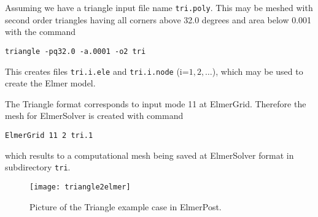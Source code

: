 Assuming we have a triangle input file name \texttt{tri.poly}. This may be meshed 
with second order triangles having all corners above 32.0 degrees and 
area below 0.001 with the command
\begin{verbatim}
triangle -pq32.0 -a.0001 -o2 tri
\end{verbatim}
\noindent This creates files \texttt{tri.i.ele} and \texttt{tri.i.node}
 (i=$1,2,\ldots$),
which may be used to create the Elmer model.

The Triangle format corresponds to input mode 11 at ElmerGrid. Therefore
the mesh for ElmerSolver is created with command
\begin{verbatim}
ElmerGrid 11 2 tri.1
\end{verbatim}
\noindent
which results to a computational mesh being saved at ElmerSolver format in
subdirectory \texttt{tri}.

\begin{figure}
\begin{center}
\texttt{[image: triangle2elmer]}
\end{center}
\caption{Picture of the Triangle example case in ElmerPost.}
\end{figure}


